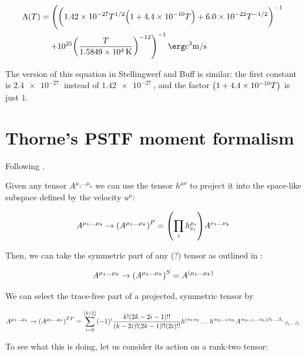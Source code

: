 \documentclass[main.tex]{subfiles}
\begin{document}
\begin{equation}
    \begin{split}
    \Lambda (T) &= \left(
    \qty(
    \num{1.42e-27}T^{1/2} \qty(
    1 + \num{4.4e-10}T
    ) + \num{6.0e-22}T^{-1/2}
    )^{-1} \right. \\
    & \quad \left. + \num{e25} \qty(\frac{T}{\SI{1.5849e4}{K}})^{-12}
    \right)^{-1} \si{\erg\cubic\centi\metre\per\second}
    \end{split}
\end{equation}

The version of this equation in Stellingwerf and Buff is similar: the first constant is \(\SI{2.4e-27}{} \) instead of \(\SI{1.42e-27}{} \), and the factor \(\qty(1 + \SI{4.4e-10}{}T)\) is just \(1\).

\section{Thorne's PSTF moment formalism}

Following \cite{thorne1981}.

Given any tensor \(A^{\mu_1 \dots \mu_k}\) we can use the tensor \(h^{\mu\nu}\) to project it into the space-like subspace defined by the velocity \(u^\mu\):

\begin{equation}
    A^{\mu_1 \dots \mu_k} \rightarrow \qty(A^{\mu_1 \dots \mu_k})^P
    = \qty(\prod_i h^{\mu_i}_{\nu_i}) A^{\nu_1 \dots \nu_k}
\end{equation}

Then, we can take the symmetric part of any (?) tensor as outlined in :

\begin{equation}
    A^{\mu_1 \dots \mu_k} \rightarrow \qty(A^{\mu_1 \dots \mu_k})^S
    = A^{(\mu_1 \dots \mu_k)}
\end{equation}

We can select the trace-free part of a projected, symmetric tensor by

\begin{equation}
    A^{\mu_1 \dots \mu_k} \rightarrow \qty(A^{\mu_1 \dots \mu_k})^{TF}
    = \sum _{i=0}   ^{\lfloor k/2 \rfloor}
    (-1)^i \frac{k! (2k-2i-1)!!}{(k-2i)! (2k-1)!! (2i)!!}
    h^{(\alpha_1 \alpha_2} \dots h^{\alpha_{2i-1} \alpha_{2i}}
    A^{\alpha_{2i+1} \dots \alpha_k) \beta_1 \dots \beta_i}\,_{\beta_1 \dots \beta_i}
\end{equation}

To see what this is doing, let us consider its action on a rank-two tensor:
\end{document}

